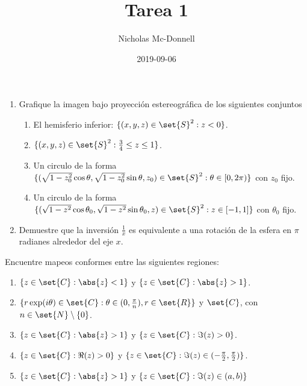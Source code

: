 \documentclass{homework}
\title{Tarea 1}
\date{2019-09-06}
\author{Nicholas Mc-Donnell}
\begin{document}
\maketitle
{}
\newpage
\tableofcontents
\newpage
{}
\begin{prob}
    \begin{enumerate}[label=(\alph*)]
        \item Grafique la imagen bajo proyección estereográfica de los siguientes conjuntos
              \begin{enumerate}[label=\roman*.]
                  \item El hemisferio inferior: \(\{(x,y,z)\in\set{S}^2:z<0\}\).
                  \item \(\{(x,y,z)\in\set{S}^2:\frac34\leq z\leq 1\}\).
                  \item Un circulo de la forma \(\{(\sqrt{1-z_0^2}\cos\theta,\sqrt{1-z_0^2}\sin\theta,z_0)\in\set{S}^2:\theta\in[0,2\pi)\}\) con \(z_0\) fijo.
                  \item Un circulo de la forma \(\{(\sqrt{1-z^2}\cos\theta_0,\sqrt{1-z^2}\sin\theta_0,z)\in\set{S}^2:z\in[-1,1]\}\) con \(\theta_0\) fijo.
              \end{enumerate}
        \item Demuestre que la inversión \(\frac1x\) es equivalente a una rotación de la esfera en \(\pi\) radianes alrededor del eje \(x\).
    \end{enumerate}
\end{prob}

\begin{sol}

\end{sol}

\begin{prob}
    Encuentre mapeos conformes entre las siguientes regiones:
    \begin{enumerate}[label=(\alph*)]
        \item \(\{z\in\set{C}:\abs{z}<1\}\) y \(\{z\in\set{C}:\abs{z}>1\}\).
        \item \(\{r\exp(i\theta)\in\set{C}:\theta\in(0,\frac\pi{n}),r\in\set{R}\}\) y \(\set{C}\), con \(n\in\set{N}\setminus\{0\}\).
        \item \(\{z\in\set{C}:\abs{z}>1\}\) y \(\{z\in\set{C}:\Im(z)>0\}\).
        \item \(\{z\in\set{C}:\Re(z)>0\}\) y \(\{z\in\set{C}:\Im(z)\in(-\frac\pi2,\frac\pi2)\}\).
        \item \(\{z\in\set{C}:\abs{z}>1\}\) y \(\{z\in\set{C}:\Im(z)\in(a,b)\}\)
    \end{enumerate}
\end{prob}
\end{document}
